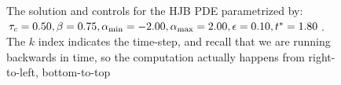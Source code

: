 \documentclass{article}
\begin{document}
\begin{figure}[h!]
\begin{center}
\caption[]{The solution and controls for the HJB PDE parametrized by:
${ \tau_{c} } = 0.50,  \beta = 0.75,
{ {\alpha}_{\textrm{min}} } = -2.00, { {\alpha}_{\textrm{max}} } = 2.00, {\epsilon}=0.10,
{ t^* } = 1.80$. The $k$ index indicates the time-step, and recall that we are
running backwards in time, so the computation actually happens from right-to-left, bottom-to-top}
\label{fig:HJB_attempt}
\end{center}
\end{figure}
\end{document}
